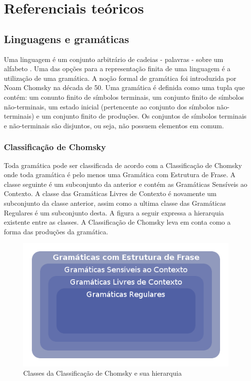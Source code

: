 \part{Referenciais teóricos}

\chapter{Linguagens e gramáticas}
Uma linguagem é um conjunto arbitrário de cadeias - palavras - sobre um alfabeto \cite{lang}.
Uma das opções para a representação finita de uma linguagem é a utilização de uma gramática.
A noção formal de gramática foi introduzida por Noam Chomsky na década de 50. Uma gramática é definida como uma tupla que contém: 
um conunto finito de símbolos terminais, um conjunto finito de símbolos não-terminais, um estado inicial (pertencente ao conjunto dos símbolos não-terminais) e 
um conjunto finito de produções. Os conjuntos de símbolos terminais e não-terminais são disjuntos, ou seja, não possuem elementos em comum. \cite{gram}

\section{Classificação de Chomsky}
Toda gramática pode ser classificada de acordo com a Classificação de Chomsky onde toda gramática é pelo menos uma Gramática com Estrutura de Frase. A classe seguinte é um subconjunto da anterior e contém as Gramáticas Sensíveis ao Contexto. A classe das Gramáticas Livres de Contexto é novamente um subconjunto da classe anterior, assim como a ultima classe das Gramáticas Regulares é um subconjunto desta. A figura a seguir expressa a hierarquia existente entre as classes. A Classificação de Chomsky leva em conta como a forma das produções da gramática.

	
\begin{figure}[H]
	\caption{\label{gram_cls}Classes da Classificação de Chomsky e sua hierarquia}
	\begin{center}
	    \includegraphics[scale=0.5]{driagrama_classes_gramaticas.png}
	\end{center}
\end{figure}

